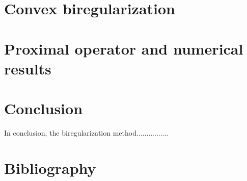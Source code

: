 \documentclass{article}
\begin{document}
\section{Convex biregularization}


\section{Proximal operator and numerical results}



\section*{Conclusion}

In conclusion, the biregularization method................



\section*{Bibliography}
\nocite{*}
\printbibliography
\end{document}
